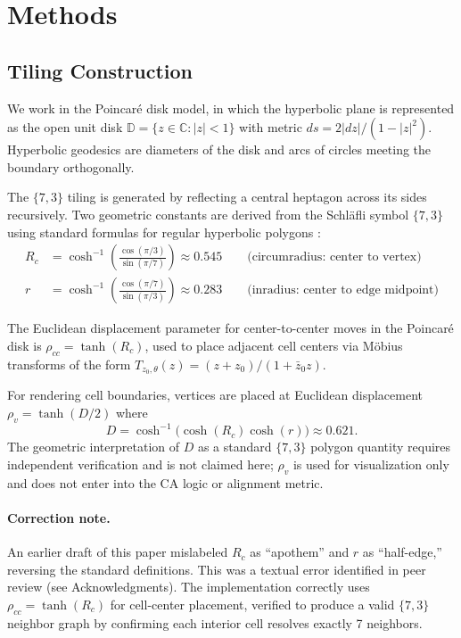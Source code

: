 \documentclass[12pt,a4paper]{article}
\begin{document}
\section{Methods}
\label{sec:methods}

\subsection{Tiling Construction}

We work in the Poincar\'{e} disk model, in which the hyperbolic plane is represented as the open unit disk $\mathbb{D}=\{z\in\mathbb{C}:|z|<1\}$ with metric $ds=2|dz|/(1-|z|^2)$. Hyperbolic geodesics are diameters of the disk and arcs of circles meeting the boundary orthogonally.

The $\{7,3\}$ tiling is generated by reflecting a central heptagon across its sides recursively. Two geometric constants are derived from the Schl\"{a}fli symbol $\{7,3\}$ using standard formulas for regular hyperbolic polygons \cite{Coxeter1954}:
\begin{align}
R_c &= \cosh^{-1}\!\left(\frac{\cos(\pi/3)}{\sin(\pi/7)}\right) \approx 0.545
  \qquad\text{(circumradius: center to vertex)}\label{eq:Rc}\\[4pt]
r   &= \cosh^{-1}\!\left(\frac{\cos(\pi/7)}{\sin(\pi/3)}\right) \approx 0.283
  \qquad\text{(inradius: center to edge midpoint)}\label{eq:r}
\end{align}

The Euclidean displacement parameter for center-to-center moves in the Poincar\'{e} disk is $\rho_{cc}=\tanh(R_c)$, used to place adjacent cell centers via M\"{o}bius transforms of the form $T_{z_0,\theta}(z)=(z+z_0)/(1+\bar{z}_0 z)$.

For rendering cell boundaries, vertices are placed at Euclidean displacement $\rho_v=\tanh(D/2)$ where
\[
  D = \cosh^{-1}\!\bigl(\cosh(R_c)\cosh(r)\bigr) \approx 0.621.
\]
The geometric interpretation of $D$ as a standard $\{7,3\}$ polygon quantity requires independent verification and is not claimed here; $\rho_v$ is used for visualization only and does not enter into the CA logic or alignment metric.

\paragraph{Correction note.} An earlier draft of this paper mislabeled $R_c$ as ``apothem'' and $r$ as ``half-edge,'' reversing the standard definitions. This was a textual error identified in peer review (see Acknowledgments). The implementation correctly uses $\rho_{cc}=\tanh(R_c)$ for cell-center placement, verified to produce a valid $\{7,3\}$ neighbor graph by confirming each interior cell resolves exactly 7 neighbors.
\end{document}

